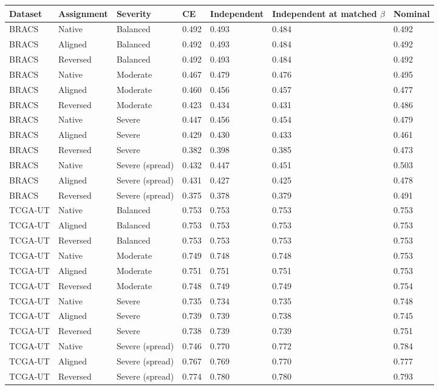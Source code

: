 \begin{tabular}{lllllll}
\toprule
Dataset & Assignment & Severity & CE & Independent & Independent at matched $\beta$ & Nominal \\
\midrule
BRACS & Native & Balanced & 0.492 & 0.493 & 0.484 & 0.492 \\
BRACS & Aligned & Balanced & 0.492 & 0.493 & 0.484 & 0.492 \\
BRACS & Reversed & Balanced & 0.492 & 0.493 & 0.484 & 0.492 \\
BRACS & Native & Moderate & 0.467 & 0.479 & 0.476 & 0.495 \\
BRACS & Aligned & Moderate & 0.460 & 0.456 & 0.457 & 0.477 \\
BRACS & Reversed & Moderate & 0.423 & 0.434 & 0.431 & 0.486 \\
BRACS & Native & Severe & 0.447 & 0.456 & 0.454 & 0.479 \\
BRACS & Aligned & Severe & 0.429 & 0.430 & 0.433 & 0.461 \\
BRACS & Reversed & Severe & 0.382 & 0.398 & 0.385 & 0.473 \\
BRACS & Native & Severe (spread) & 0.432 & 0.447 & 0.451 & 0.503 \\
BRACS & Aligned & Severe (spread) & 0.431 & 0.427 & 0.425 & 0.478 \\
BRACS & Reversed & Severe (spread) & 0.375 & 0.378 & 0.379 & 0.491 \\
TCGA-UT & Native & Balanced & 0.753 & 0.753 & 0.753 & 0.753 \\
TCGA-UT & Aligned & Balanced & 0.753 & 0.753 & 0.753 & 0.753 \\
TCGA-UT & Reversed & Balanced & 0.753 & 0.753 & 0.753 & 0.753 \\
TCGA-UT & Native & Moderate & 0.749 & 0.748 & 0.748 & 0.753 \\
TCGA-UT & Aligned & Moderate & 0.751 & 0.751 & 0.751 & 0.753 \\
TCGA-UT & Reversed & Moderate & 0.748 & 0.749 & 0.749 & 0.754 \\
TCGA-UT & Native & Severe & 0.735 & 0.734 & 0.735 & 0.748 \\
TCGA-UT & Aligned & Severe & 0.739 & 0.739 & 0.738 & 0.745 \\
TCGA-UT & Reversed & Severe & 0.738 & 0.739 & 0.739 & 0.751 \\
TCGA-UT & Native & Severe (spread) & 0.746 & 0.770 & 0.772 & 0.784 \\
TCGA-UT & Aligned & Severe (spread) & 0.767 & 0.769 & 0.770 & 0.777 \\
TCGA-UT & Reversed & Severe (spread) & 0.774 & 0.780 & 0.780 & 0.793 \\
\bottomrule
\end{tabular}
